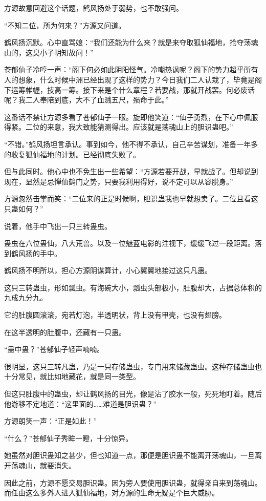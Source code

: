 \begin{this_body}
方源故意回避这个话题，鹤风扬处于弱势，也不敢强问。

“不知二位，所为何来？”方源又问道。

鹤风扬沉默。心中直骂娘：“我们还能为什么来？就是来夺取狐仙福地，抢夺荡魂山的，这臭小子明知故问！”

苍郁仙子冷哼一声：“阁下何必如此阴阳怪气。冷嘲热讽呢？阁下的势力超乎所有人的想象，什么时候中洲已经出现了这样的势力？今日我们二人认栽了，毕竟是阁下运筹帷幄，技高一筹。接下来是个什么章程？若要战，那就开战罢。何必废话呢？我二人奉陪到底，大不了血溅五尺，殒命于此。”

这番话不禁让方源多看了苍郁仙子一眼。旋即他笑道：“仙子勇烈，在下心中佩服得紧。二位的来意，我大致能猜测得出。应该就是荡魂山上的胆识蛊吧。”

“不错。”鹤风扬坦言承认。事到如今，他不得不承认，自己辛苦谋划，准备一年多的收复狐仙福地的计划。已经彻底失败了。

但与此同时。他心中也不免生出一些希望：“方源若要开战，早就战了。但却说到现在，显然是忌惮仙鹤门之势，只要我利用得好，说不定可以从容脱身。”

方源忽然击掌而笑：“二位来的正是时候啊，胆识蛊我也早就想卖了。二位且看这只蛊如何？”

说着，他手中飞出一只三转蛊虫。

蛊虫在六位蛊仙，八大荒兽。以及一位魅蓝电影的注视下，缓缓飞过一段距离。落到鹤风扬的手中。

鹤风扬不明所以，担心方源阴谋算计，小心翼翼地接过这只凡蛊。

这只三转蛊虫，形如瓢虫。有海碗大小，瓢虫头部极小，肚腹却大，占据总体积的九成九分九。

它的肚腹圆滚滚，宛若灯泡，半透明状，背上没有甲壳，也没有翅膀。

在这半透明的肚腹中，还藏有一只蛊。

“蛊中蛊？”苍郁仙子轻声喃喃。

很明显，这只三转凡蛊，乃是一只存储蛊虫，专门用来储藏蛊虫。这种存储蛊虫也十分常见，就比如地藏花，就是同一类型。

但这只肚腹中的蛊虫，却让鹤风扬的目光，像是沾了胶水一般，死死地盯着。随后他游移不定地道：“这里面的……难道是胆识蛊？”

方源朗笑一声：“正是如此！”

“什么？”苍郁仙子秀眸一瞪，十分惊异。

她虽然对胆识蛊知之甚少，但也知道一点，那便是胆识蛊不能离开荡魂山，一旦离开荡魂山，就要消失。

因此之前，方源不愿交易胆识蛊。因为旁人要使用胆识蛊，就得亲自来到荡魂山。而任由这么多外人进入狐仙福地，对方源的生命无疑是个巨大威胁。


\end{this_body}
